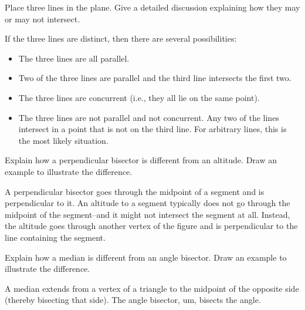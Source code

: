 \documentclass[nooutcomes]{ximera}
\begin{document}
\begin{problem}
Place three lines in the plane. Give a detailed discussion explaining
  how they may or may not intersect.
\begin{freeResponse}
\begin{hint}
If the three lines are distinct, then there are several possibilities: 
\begin{itemize}
\item The three lines are all parallel. 
\item Two of the three lines are parallel and the third line intersects the first two. 
\item The three lines are concurrent (i.e., they all lie on the same point).
\item The three lines are not parallel and not concurrent.  Any two of the lines intersect in a point that is not on the third line.  For arbitrary lines, this is the most likely situation. 
\end{itemize}
\end{hint}
\end{freeResponse}
\end{problem}

\begin{problem}
Explain how a perpendicular bisector is different from an
  altitude. Draw an example to illustrate the difference.
\begin{freeResponse}
\begin{hint}
A perpendicular bisector goes through the midpoint of a segment and is perpendicular to it.  An altitude to a segment typically does not go through the midpoint of the segment--and it might not intersect the segment at all.  Instead, the altitude goes through another vertex of the figure and is perpendicular to the line containing the segment.    
\end{hint}
\end{freeResponse}
\end{problem}

\begin{problem}
Explain how a median is different from an angle bisector.  Draw an
  example to illustrate the difference.
\begin{freeResponse}
\begin{hint}
A median extends from a vertex of a triangle to the midpoint of the opposite side (thereby bisecting that side).  The angle bisector, um, bisects the angle.
\end{hint}
\end{freeResponse}
\end{problem}
\end{document}
